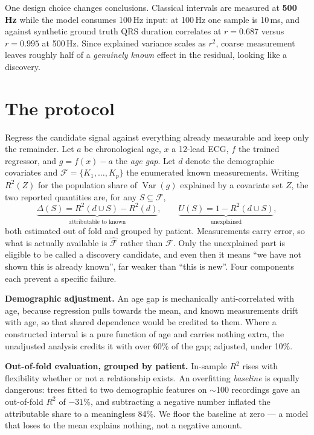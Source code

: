 \documentclass{article}
\begin{document}
One design choice changes conclusions. Classical intervals are measured at
\textbf{500\,Hz} while the model consumes 100\,Hz input: at 100\,Hz one sample is
10\,ms, and against synthetic ground truth QRS duration correlates at
$r = 0.687$ versus $r = 0.995$ at 500\,Hz. Since explained variance scales as
$r^2$, coarse measurement leaves roughly half of a \emph{genuinely known} effect
in the residual, looking like a discovery.

\section{The protocol}
\label{sec:protocol}

Regress the candidate signal against everything already measurable and keep only
the remainder. Let $a$ be chronological age, $x$ a 12-lead ECG, $f$ the trained
regressor, and $g = f(x) - a$ the \emph{age gap}. Let $d$ denote the demographic
covariates and $\mathcal{F} = \{K_1,\dots,K_p\}$ the enumerated known
measurements. Writing $R^2(Z)$ for the population share of
$\operatorname{Var}(g)$ explained by a covariate set $Z$, the two reported
quantities are, for any $S \subseteq \mathcal{F}$,
\[
\underbrace{\Delta(S) = R^2(d \cup S) - R^2(d)}_{\text{attributable to known}},
\qquad
\underbrace{U(S) = 1 - R^2(d \cup S)}_{\text{unexplained}} ,
\]
both estimated out of fold and grouped by patient. Measurements carry error, so
what is actually available is $\hat{\mathcal{F}}$ rather than $\mathcal{F}$.
Only the unexplained part is
eligible to be called a discovery candidate, and even then it means ``we have not
shown this is already known'', far weaker than ``this is new''. Four components
each prevent a specific failure.

\textbf{Demographic adjustment.} An age gap is mechanically anti-correlated with
age, because regression pulls towards the mean, and known measurements drift with
age, so that shared dependence would be credited to them. Where a constructed
interval is a pure function of age and carries nothing extra, the unadjusted
analysis credits it with over 60\% of the gap; adjusted, under 10\%.

\textbf{Out-of-fold evaluation, grouped by patient.} In-sample $R^2$ rises with
flexibility whether or not a relationship exists. An overfitting \emph{baseline}
is equally dangerous: trees fitted to two demographic features on $\sim$100
recordings gave an out-of-fold $R^2$ of $-31\%$, and subtracting a negative
number inflated the attributable share to a meaningless 84\%. We floor the
baseline at zero --- a model that loses to the mean explains nothing, not a
negative amount.
\end{document}
